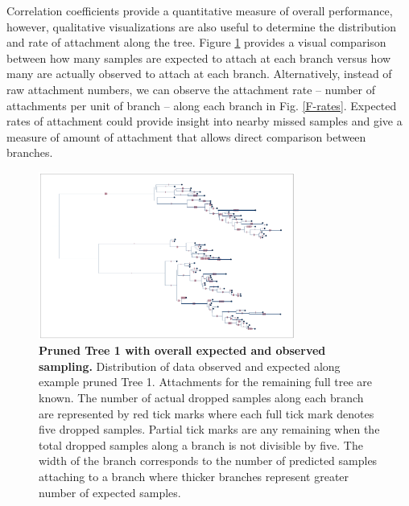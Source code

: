 \documentclass[11pt,oneside,letterpaper]{article}
\newcommand\tab[1][1cm]{\hspace*{#1}}
\begin{document}
\tab Correlation coefficients provide a quantitative measure of overall performance, however, qualitative visualizations are also useful to determine the distribution and rate of attachment along the tree. Figure \ref{F-obs-exp} provides a visual comparison between how many samples are expected to attach at each branch versus how many are actually observed to attach at each branch. Alternatively, instead of raw attachment numbers, we can observe the attachment rate -- number of attachments per unit of branch -- along each branch in Fig. \ref{F-rates}. Expected rates of attachment could provide insight into nearby missed samples and give a measure of amount of attachment that allows direct comparison between branches.

\begin{figure}[h]
 \centering
	\includegraphics[width=0.75\textwidth]{figures/obs-exp}
	\caption{\textbf{Pruned Tree 1 with overall expected and observed sampling.}
	 Distribution of data observed and expected along example pruned Tree 1. Attachments for the remaining full tree are known. The number of actual dropped samples along each branch are represented by red tick marks where each full tick mark denotes five dropped samples. Partial tick marks are any remaining when the total dropped samples along a branch is not divisible by five. The width of the branch corresponds to the number of predicted samples attaching to a branch where thicker branches represent greater number of expected samples. 
	}
	\label{F-obs-exp}
\end{figure}
\end{document}
